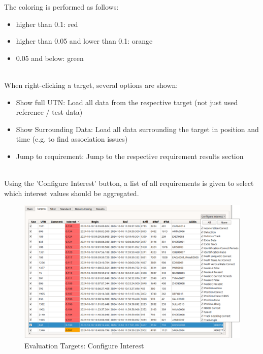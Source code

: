 The coloring is performed as follows:
\begin{itemize}  
\item higher than 0.1: red
\item higher than 0.05 and lower than 0.1: orange
\item 0.05 and below: green
\end{itemize}
\ \\

When right-clicking a target, several options are shown:
\begin{itemize}  
\item Show full UTN: Load all data from the respective target (not just used reference / test data)
\item Show Surrounding Data: Load all data surrounding the target in position and time (e.g. to find association issues)
\item Jump to requirement: Jump to the respective requirement results section
\end{itemize}
\ \\

Using the 'Configure Interest' button, a list of all requirements is given to select which interest values should be aggregated.
\begin{figure}[H]
  \hspace*{-2.5cm}
    \includegraphics[width=19cm,frame]{figures/eval_targets_config_interest.png}
  \caption{Evaluation Targets: Configure Interest}
\end{figure}
